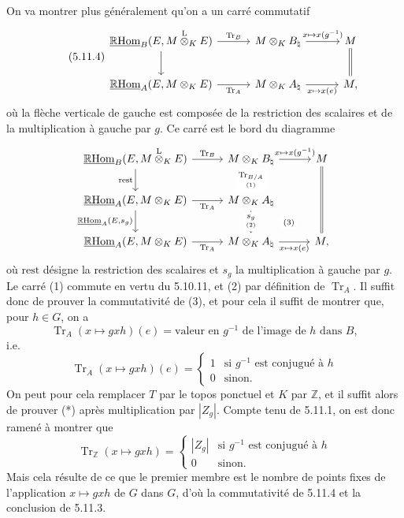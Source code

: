 \documentclass[11pt]{article}
\newcommand{\R}{\mathbb{R}}\newcommand{\RHomCore}{\mathbb{R}\mathrm{Hom}}
\providecommand{\RHom}{\RHomCore}
\providecommand{\uRHom}{\underline{\RHom}}
\providecommand{\Tr}{\operatorname{Tr}}
\providecommand{\Tr}{\operatorname{Tr}}
\providecommand{\lten}{\overset{\mathrm L}{\otimes}}
\providecommand{\Tr}{\operatorname{Tr}}
\providecommand{\RHom}{\RHomCore}
\providecommand{\lten}{\overset{\mathrm L}{\otimes}}
\providecommand{\RHom}{\R\mathcal{H}om}
\providecommand{\lten}{\overset{\mathrm L}{\otimes}}
\providecommand{\R}{\mathrm R}
\providecommand{\Tr}{\operatorname{Tr}}
\providecommand{\lten}{\overset{\mathrm L}{\otimes}}
\providecommand{\lten}{\overset{\mathrm L}{\otimes}}
\providecommand{\lten}{\overset{\mathrm L}{\otimes}}
\providecommand{\RHom}{\RHomCore}
\providecommand{\Tr}{\operatorname{Tr}}
\providecommand{\lten}{\overset{\mathrm L}{\otimes}}
\begin{document}
On va
montrer plus généralement qu'on a un carré commutatif
\begin{equation}\tag{5.11.4}
\begin{tikzcd}[column sep=3.0em,row sep=2.2em]
\uRHom_B(E,M\lten_KE) \arrow[r,"\Tr_B"] \arrow[d] &
M\otimes_KB_\natural \arrow[r,"{x\mapsto x(g^{-1})}"] &
M \arrow[d,equal] \\
\uRHom_A(E,M\otimes_KE) \arrow[r,"\Tr_A"'] &
M\otimes_KA_\natural \arrow[r,"{x\mapsto x(e)}"'] &
M,
\end{tikzcd}
\end{equation}
où la flèche verticale de gauche est composée de la restriction des scalaires et de la multiplication à gauche par $g$. Ce carré est le bord du diagramme
\[
\begin{tikzcd}[column sep=2.8em,row sep=2.0em]
\uRHom_B(E,M\lten_KE) \arrow[r,"\Tr_B"] \arrow[d,"\mathrm{rest}"'] &
M\otimes_KB_\natural \arrow[r,"{x\mapsto x(g^{-1})}"] \arrow[d,"{\underset{(1)}{\Tr_{B/A}}}" description] &
M \arrow[dd,equal] \\
\uRHom_A(E,M\otimes_KE) \arrow[r,"\Tr_A"'] \arrow[d,"{\uRHom_A(E,s_g)}"'] &
M\otimes_KA_\natural \arrow[d,"{\underset{(2)}{s_g}}" description] \arrow[dr,phantom,"\scriptstyle(3)" description] &
\\
\uRHom_A(E,M\otimes_KE) \arrow[r,"\Tr_A"'] &
M\otimes_KA_\natural \arrow[r,"{x\mapsto x(e)}"'] &
M,
\end{tikzcd}
\]
où $\mathrm{rest}$ désigne la restriction des scalaires et $s_g$ la multiplication à gauche par $g$. Le carré (1) commute en vertu du 5.10.11, et (2) par définition de $\Tr_A$. Il suffit donc de prouver la commutativité de (3), et pour cela il suffit de montrer que, pour $h\in G$, on a
\[
\Tr_A(x\mapsto gxh)(e)=\text{valeur en }g^{-1}\text{ de l'image de }h\text{ dans }B,
\]
i.e.
\begin{equation}\tag{*}
\Tr_A(x\mapsto gxh)(e)=
\begin{cases}
1 & \text{si } g^{-1}\text{ est conjugué à }h\\
0 & \text{sinon}.
\end{cases}
\end{equation}
On peut pour cela remplacer $T$ par le topos ponctuel et $K$ par $\mathbb Z$, et il suffit alors de prouver (*) après multiplication par $|Z_g|$. Compte tenu de 5.11.1, on est donc ramené à montrer que
\[
\Tr_{\mathbb Z}(x\mapsto gxh)=
\begin{cases}
|Z_g| & \text{si } g^{-1}
\text{ est conjugué à }h\\
0 & \text{sinon}.
\end{cases}
\]
Mais cela résulte de ce que le premier membre est le nombre de points fixes de l'application $x\mapsto gxh$ de $G$ dans $G$, d'où la commutativité de 5.11.4 et la conclusion de 5.11.3.
\end{document}
